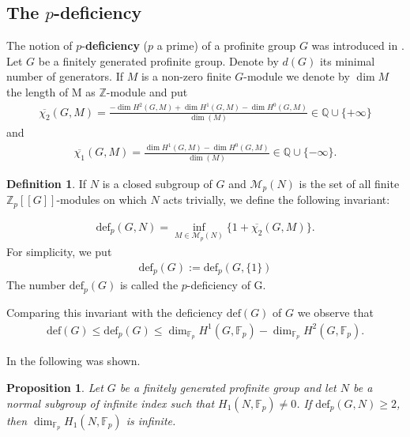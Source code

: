 \documentclass[10pt]{amsart}
\theoremstyle{plain}
\newtheorem{prop}{Proposition}
\theoremstyle{definition}
\newtheorem*{defi}{Definition}
\theoremstyle{remark}
\numberwithin{prop}{section}
\numberwithin{example}{section}
\numberwithin{equation}{section}
\newcommand{\Z}{\mathbb{Z}}
\newcommand{\Q}{\mathbb{Q}}
\newcommand{\F}{\mathbb{F}}
\newcommand{\de}{\mathrm{def}}
\begin{document}
	\subsection{The $p$-deficiency} 
	The  notion of $p$-\textbf{deficiency}  ($p$ a prime) of a profinite group $G$  was introduced in \cite[\S 2.2]{G}. Let $G$ be a finitely generated profinite group. Denote by $d(G)$ its minimal
	number of generators. If $M$ is a non-zero finite $G$-module we denote by $\dim M$
	the length of M as $\Z$-module and put 
	\begin{align}\label{eq01}
		\overline{\chi_2}(G,M)=\frac{-\dim H^2(G,M)+\dim  H^1(G,M)-\dim   H^0(G,M)}{\dim(M) }\in \Q\cup \{+\infty\}
	\end{align}
	and 
	\begin{align}
		\overline{\chi_1}(G,M)=\frac{\dim H^1(G,M)-\dim H^0(G,M)}{\dim(M)} \in \Q\cup \{-\infty\}.
	\end{align}
	\begin{defi}
		If $N$ is a closed subgroup of $G$ and $\mathcal{M}_p(N)$  is the set of all finite $\Z_p[[G]]$-modules on which $N$ acts trivially, we define  the following invariant:
		
		\begin{align}	
			\de_p(G,N)=\displaystyle\inf_{M\in \mathcal{M}_p(N) }\{1+\overline{\chi_2}(G,M)\}.
		\end{align}
		For simplicity, we put
		\begin{align}
			\de_p(G):=\de_p(G,\{1\}) 
		\end{align}
		The number $\de_p(G)$ is called the $p$-deficiency of G.
	\end{defi}
	
	Comparing this invariant
	with the deficiency  $\de(G)$ of $G$  we observe that
	\begin{align}\label{eq001}
		\de(G)\leq \de_p(G)\leq \dim_{\F_p}H^1(G, \F_p)-\dim_{\F_p}H^2(G, \F_p).
	\end{align}
	
	In \cite[Proposition 3.2]{G} the following was shown. 
	\begin{prop} \label{pp1}
		Let $G$ be a finitely generated profinite group and let $N$ be a
		normal subgroup of infinite index such that $H_1(N, \F_p)\neq 0$. If $\de_p(G, N)\geq 2$, then $\dim_{\F_p}H_1(N, \F_p)$ is infinite. 
	\end{prop}
	
\end{document}
